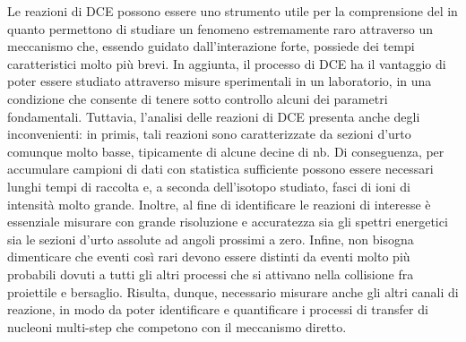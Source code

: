 Le reazioni di DCE possono essere uno strumento utile per la comprensione del \doppiobeta{} in quanto permettono di studiare un fenomeno estremamente raro attraverso un meccanismo che, essendo guidato dall'interazione forte, possiede dei tempi caratteristici molto più brevi. 
In aggiunta, il processo di DCE ha il vantaggio di poter essere studiato attraverso misure sperimentali in un laboratorio, in una condizione che consente di tenere sotto controllo alcuni dei parametri fondamentali.
Tuttavia, l'analisi delle reazioni di DCE presenta anche degli inconvenienti: in primis, tali reazioni sono caratterizzate da sezioni d'urto comunque molto basse, tipicamente di alcune decine di nb.
Di conseguenza, per accumulare campioni di dati con statistica sufficiente possono essere necessari lunghi tempi di raccolta e, a seconda dell'isotopo studiato, fasci di ioni di intensità molto grande.
Inoltre, al fine di identificare le reazioni di interesse è essenziale misurare con grande risoluzione e accuratezza sia gli spettri energetici sia le sezioni d'urto assolute ad angoli prossimi a zero. 
Infine, non bisogna dimenticare che eventi così rari devono essere distinti da eventi molto più probabili dovuti a tutti gli altri processi che si attivano nella collisione fra proiettile e bersaglio. 
Risulta, dunque, necessario misurare anche gli altri canali di reazione, in modo da poter identificare e quantificare i processi di transfer di nucleoni multi-step che competono con il meccanismo diretto.




\section{} \label{sez:progetto_numen}

